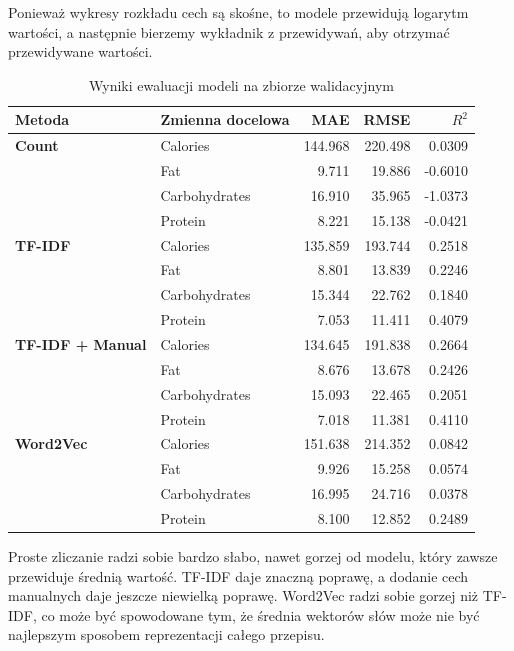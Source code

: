 \documentclass[12pt,a4paper]{article}
\begin{document}
\noindent Ponieważ wykresy rozkładu cech są skośne, to modele przewidują logarytm wartości, a następnie bierzemy wykładnik z przewidywań, aby otrzymać przewidywane wartości. \\

\begin{table}[htbp]
    \centering
    \caption{Wyniki ewaluacji modeli na zbiorze walidacyjnym}
    \label{tab:wyniki_wektoryzacji_val}
    \renewcommand{\arraystretch}{1.2}
    \begin{tabular}{|l|l|r|r|r|}
        \hline
        \textbf{Metoda} & \textbf{Zmienna docelowa} & \textbf{MAE} & \textbf{RMSE} & \textbf{$R^2$} \\ \hline
        
        \textbf{Count} & Calories & 144.968 & 220.498 & 0.0309 \\ 
        & Fat & 9.711 & 19.886 & -0.6010 \\ 
        & Carbohydrates & 16.910 & 35.965 & -1.0373 \\ 
        & Protein & 8.221 & 15.138 & -0.0421 \\ \hline
        
        \textbf{TF-IDF} & Calories & 135.859 & 193.744 & 0.2518 \\ 
        & Fat & 8.801 & 13.839 & 0.2246 \\ 
        & Carbohydrates & 15.344 & 22.762 & 0.1840 \\ 
        & Protein & 7.053 & 11.411 & 0.4079 \\ \hline
        
        \textbf{TF-IDF + Manual} & Calories & 134.645 & 191.838 & 0.2664 \\ 
        & Fat & 8.676 & 13.678 & 0.2426 \\ 
        & Carbohydrates & 15.093 & 22.465 & 0.2051 \\ 
        & Protein & 7.018 & 11.381 & 0.4110 \\ \hline
        
        \textbf{Word2Vec} & Calories & 151.638 & 214.352 & 0.0842 \\ 
        & Fat & 9.926 & 15.258 & 0.0574 \\ 
        & Carbohydrates & 16.995 & 24.716 & 0.0378 \\ 
        & Protein & 8.100 & 12.852 & 0.2489 \\ \hline
    \end{tabular}
\end{table}

\noindent Proste zliczanie radzi sobie bardzo słabo, nawet gorzej od modelu, który zawsze przewiduje średnią wartość. TF-IDF daje znaczną poprawę, a dodanie cech manualnych daje jeszcze niewielką poprawę. Word2Vec radzi sobie gorzej niż TF-IDF, co może być spowodowane tym, że średnia wektorów słów może nie być najlepszym sposobem reprezentacji całego przepisu. \\ 
\end{document}

